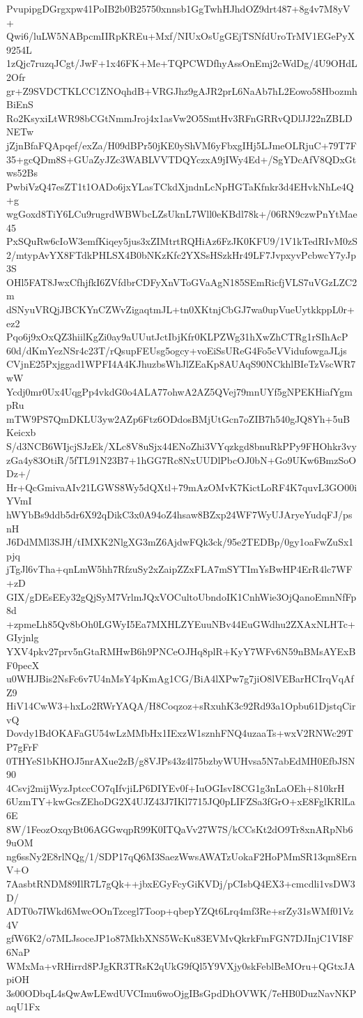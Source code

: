PvupipgDGrgxpw41PoIB2b0B25750xnnsb1GgTwhHJhdOZ9drt487+8g4v7M8yV+
Qwi6/luLW5NABpcmIIRpKREu+Mxf/NIUxOsUgGEjTSNfdUroTrMV1EGePyX9254L
1zQjc7ruzqJCgt/JwF+1x46FK+Me+TQPCWDfhyAssOnEmj2cWdDg/4U9OHdL2Ofr
gr+Z9SVDCTKLCC1ZNOqhdB+VRGJhz9gAJR2prL6NaAb7hL2Eowo58HbozmhBiEnS
Ro2KsyxiLtWR98bCGtNmmJroj4x1asVw2O5SmtHv3RFnGRRvQDlJJ22nZBLDNETw
jZjnBfaFQApqef/exZa/H09dBPr50jKE0yShVM6yFbxgIHj5LJmeOLRjuC+79T7F
35+gcQDm8S+GUaZyJZc3WABLVVTDQYczxA9jIWy4Ed+/SgYDcAfV8QDxGtws52Bs
PwbiVzQ47esZT1t1OADo6jxYLasTCkdXjndnLcNpHGTaKfnkr3d4EHvkNhLe4Q+g
wgGoxd8TiY6LCu9rugrdWBWbcLZsUknL7Wll0eKBdl78k+/06RN9czwPnYtMae45
PxSQuRw6cIoW3emfKiqey5jus3xZIMtrtRQHiAz6FzJK0KFU9/1V1kTedRIvM0zS
2/mtypAvYX8FTdkPHLSX4B0bNKzKfc2YXSsHSzkHr49LF7JvpxyvPcbwcY7yJp3S
OHl5FAT8JwxCfhjfkI6ZVfdbrCDFyXnVToGVaAgN185SEmRicfjVLS7uVGzLZC2m
dSNyuVRQjJBCKYnCZWvZigaqtmJL+tn0XKtnjCbGJ7wa0upVueUytkkppL0r+ez2
Pqo6j9xOxQZ3hiilKgZi0ay9aUUutJctIbjKfr0KLPZWg31hXwZhCTRg1rSIhAcP
60d/dKmYezNSr4c23T/rQsupFEUsg5ogcy+voEiSsUReG4Fo5cVVidufowgaJLjs
CVjnE25Pxjggad1WPFI4A4KJhuzbsWhJlZEaKp8AUAqS90NCkhlBIeTzVscWR7wW
Ycdj0mr0Ux4UqgPp4vkdG0o4ALA77ohwA2AZ5QVej79mnUYf5gNPEKHiafYgmpRu
mTW9PS7QmDKLU3yw2AZp6Ftz6ODdosBMjUtGcn7oZIB7h540gJQ8Yh+5uBKeicxb
S/d3NCB6WIjcjSJzEk/XLc8V8uSjx44ENoZhi3VYqzkgd8bnuRkPPy9FHOhkr3vy
zGa4y83OtiR/5fTL91N23B7+1hGG7Rc8NxUUDlPbcOJ0bN+Go9UKw6BmzSoODz+/
Hr+QcGmivaAIv21LGWS8Wy5dQXtl+79mAzOMvK7KictLoRF4K7quvL3GO00iYVmI
hWYbBs9ddb5dr6X92qDikC3x0A94oZ4hsaw8BZxp24WF7WyUJAryeYudqFJ/psnH
J6DdMMl3SJH/tIMXK2NlgXG3mZ6AjdwFQk3ck/95e2TEDBp/0gy1oaFwZuSx1pjq
jTgJl6vTha+qnLmW5hh7RfzuSy2xZaipZZxFLA7mSYTImYsBwHP4ErR4lc7WF+zD
GIX/gDEsEEy32gQjSyM7VrlmJQxVOCultoUbndoIK1CnhWie3OjQanoEmnNfFp8d
+zpmeLh85Qv8bOh0LGWyI5Ea7MXHLZYEuuNBv44EuGWdhu2ZXAxNLHTc+GIyjnlg
YXV4pkv27prv5nGtaRMHwB6h9PNCeOJHq8plR+KyY7WFv6N59nBMsAYExBF0pecX
u0WHJBis2NsFc6v7U4nMsY4pKmAg1CG/BiA4lXPw7g7jiO8lVEBarHCIrqVqAfZ9
HiV14CwW3+hxLo2RWrYAQA/H8Coqzoz+sRxuhK3c92Rd93a1Opbu61DjstqCirvQ
Dovdy1BdOKAFaGU54wLzMMbHx1IExzW1sznhFNQ4uzaaTs+wxV2RNWc29TP7gFrF
0THYeS1bKHOJ5nrAXue2zB/g8VJPs43z4l75bzbyWUHvsa5N7abEdMH0EfbJSN90
4Csvj2mijWyzJptccCO7qIfvjiLP6DIYEv0f+IuOGIsvI8CG1g3nLaOEh+810krH
6UzmTY+kwGcsZEhoDG2X4UJZ43J7IKl7715JQ0pLIFZSa3fGrO+xE8FglKRlLa6E
8W/1FeozOxqyBt06AGGwqpR99K0ITQaVv27W7S/kCCsKt2dO9Tr8xnARpNb69uOM
ng6ssNy2E8rlNQg/1/SDP17qQ6M3SaezWwsAWATzUokaF2HoPMmSR13qm8ErnV+O
7AasbtRNDM89IlR7L7gQk++jbxEGyFcyGiKVDj/pCIsbQ4EX3+cmcdli1vsDW3D/
ADT0o7IWkd6MwcOOnTzcegl7Toop+qbepYZQt6Lrq4mf3Re+srZy31sWMf01Vz4V
gfW6K2/o7MLJsoceJP1o87MkbXNS5WcKu83EVMvQkrkFmFGN7DJInjC1VI8F6NaP
WMxMa+vRHirrd8PJgKR3TRsK2qUkG9fQl5Y9VXjy0skFeblBeMOru+QGtxJApiOH
3s00ODbqL4sQwAwLEwdUVCImu6woOjgIBsGpdDhOVWK/7eHB0DuzNavNKPaqU1Fx
